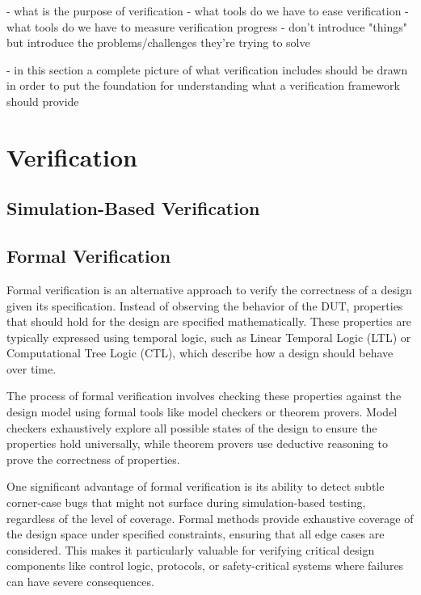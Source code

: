 \documentclass[12pt]{report}
\begin{document}
- what is the purpose of verification
- what tools do we have to ease verification
- what tools do we have to measure verification progress
- don't introduce "things" but introduce the problems/challenges they're trying to solve

- in this section a complete picture of what verification includes should be drawn in order to put the foundation for
understanding what a verification framework should provide

\section{Verification} %

\subsection{Simulation-Based Verification} %


\subsection{Formal Verification} %

Formal verification is an alternative approach to verify the correctness of a design given its specification. Instead
of observing the behavior of the DUT, properties that should hold for the design are specified mathematically. These
properties are typically expressed using temporal logic, such as Linear Temporal Logic (LTL) or Computational Tree
Logic (CTL), which describe how a design should behave over time.

The process of formal verification involves checking these properties against the design model using formal tools
like model checkers or theorem provers. Model checkers exhaustively explore all possible states of the design to
ensure the properties hold universally, while theorem provers use deductive reasoning to prove the correctness of properties.

One significant advantage of formal verification is its ability to detect subtle corner-case bugs that might not
surface during simulation-based testing, regardless of the level of coverage. Formal methods provide exhaustive
coverage of the design space under specified constraints, ensuring that all edge cases are considered. This makes it
particularly valuable for verifying critical design components like control logic, protocols, or safety-critical
systems where failures can have severe consequences.
\end{document}
